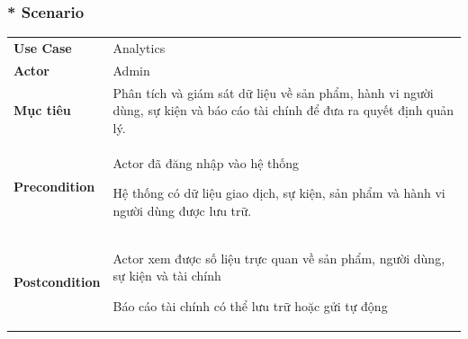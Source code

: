 \documentclass{article}
\begin{document}
\begin{table}[h!]
\subsubsection*{* Scenario}
\begin{table}[h!]
\centering
\begin{tabular}{p{3cm} p{11cm}}
\hline
\vspace{0.025cm}
\textbf{Use Case} & \vspace{0.025cm} Analytics \\
\textbf{Actor} & Admin \\
\textbf{Mục tiêu} & Phân tích và giám sát dữ liệu về sản phẩm, hành vi người dùng, sự kiện và báo cáo tài chính để đưa ra quyết định quản lý. \\
\textbf{Precondition} & 
    Actor đã đăng nhập vào hệ thống

    Hệ thống có dữ liệu giao dịch, sự kiện, sản phẩm và hành vi người dùng được lưu trữ. \\
\textbf{Postcondition} & 
    Actor xem được số liệu trực quan về sản phẩm, người dùng, sự kiện và tài chính

    Báo cáo tài chính có thể lưu trữ hoặc gửi tự động


\end{tabular}
\end{table}
\end{table}
\end{document}
